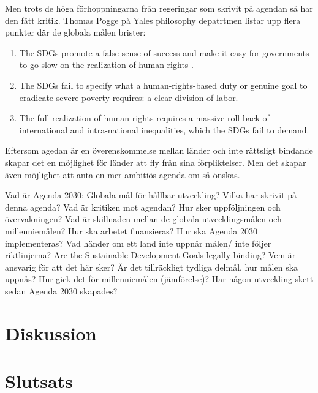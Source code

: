\documentclass{report}
\begin{document}
Men trots de höga förhoppningarna från regeringar som skrivit på agendan så har den fått kritik. Thomas Pogge \cite{critique} på Yales philosophy depatrtmen listar upp flera punkter där de globala målen brister: 

\begin{enumerate}
\item The SDGs promote a false sense of success and make it easy for governments to go
slow on the realization of human rights .
\item The SDGs fail to specify what a human-rights-based duty or genuine goal to eradicate severe poverty requires: a clear division of labor.
\item The full realization of human rights requires a massive roll-back of international and intra-national inequalities, which the SDGs fail to demand.
\end{enumerate}


Eftersom agedan är en överenskommelse mellan länder och inte rättsligt bindande skapar det en möjlighet för länder att fly från sina förpliktelser. Men det skapar även möjlighet att anta en mer ambitiös agenda om så önskas. \cite{critique}


Vad är Agenda 2030: Globala mål för hållbar utveckling? 
Vilka har skrivit på denna agenda?
Vad är kritiken mot agendan? 
Hur sker uppföljningen och övervakningen?
Vad är skillnaden mellan de globala utvecklingsmålen och millenniemålen?
Hur ska arbetet finansieras?
Hur ska Agenda 2030 implementeras? 
Vad händer om ett land inte uppnår målen/ inte följer riktlinjerna? 
Are the Sustainable Development Goals legally binding? 
Vem är ansvarig för att det här sker?
Är det tillräckligt tydliga delmål, hur målen ska uppnås?
Hur gick det för millenniemålen (jämförelse)? 
Har någon utveckling skett sedan Agenda 2030 skapades?



\newpage
\section{Diskussion}

\newpage
\section{Slutsats}

 
\end{document}
